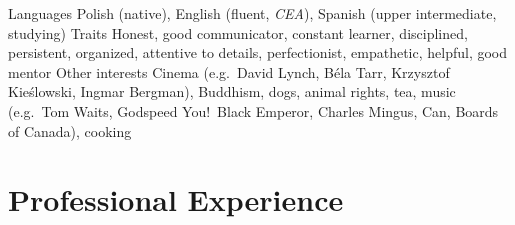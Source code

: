 \begin{sectionlist}
    \sectionlistitem
        {Languages}
        {
            Polish (native),
            English (fluent, \emph{CEA}),
            Spanish (upper intermediate, studying)
        }
    \sectionlistitem
        {Traits}
        {
            Honest, good communicator, constant learner, disciplined,
            persistent, organized, attentive to details, perfectionist,
            empathetic, helpful, good mentor
        }
    \sectionlistitem
        {Other interests}
        {
            Cinema (e.g.~David Lynch, Béla Tarr, Krzysztof Kieślowski, Ingmar
            Bergman), Buddhism, dogs, animal rights, tea, music (e.g.~Tom Waits,
            Godspeed You!\ Black Emperor, Charles Mingus, Can, Boards of Canada),
            cooking
        }
\end{sectionlist}


\section{Professional Experience}

